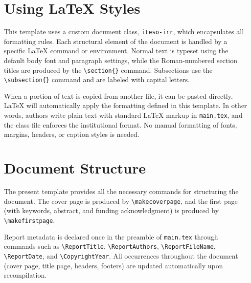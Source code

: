 \documentclass{iteso-irr}
\begin{document}

\section{Using \LaTeX{} Styles}
\label{sec:styles}

This template uses a custom document class, \texttt{iteso-irr}, which
encapsulates all formatting rules. Each structural element of the document
is handled by a specific \LaTeX{} command or environment. Normal text is
typeset using the default body font and paragraph settings, while the
Roman-numbered section titles are produced by the \verb|\section{}|
command. Subsections use the \verb|\subsection{}| command and are labeled
with capital letters.

When a portion of text is copied from another file, it can be pasted
directly. \LaTeX{} will automatically apply the formatting defined in
this template. In other words, authors write plain text with standard
\LaTeX{} markup in \texttt{main.tex}, and the class file enforces the
institutional format. No manual formatting of fonts, margins, headers,
or caption styles is needed.


\section{Document Structure}
\label{sec:structure}

The present template provides all the necessary commands for structuring
the document. The cover page is produced by \verb|\makecoverpage|, and the
first page (with keywords, abstract, and funding acknowledgment) is
produced by \verb|\makefirstpage|.

Report metadata is declared once in the preamble of \texttt{main.tex}
through commands such as \verb|\ReportTitle|, \verb|\ReportAuthors|,
\verb|\ReportFileName|, \verb|\ReportDate|, and \verb|\CopyrightYear|.
All occurrences throughout the document (cover page, title page, headers,
footers) are updated automatically upon recompilation.
\end{document}
